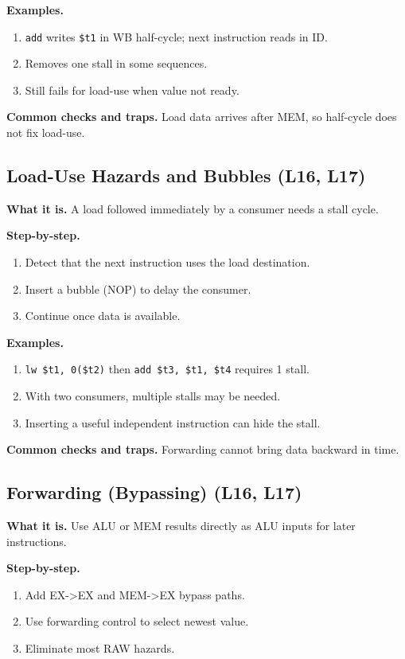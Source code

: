 \documentclass[11pt]{article}
\begin{document}
\textbf{Examples.}
\begin{enumerate}[leftmargin=*]
  \item \texttt{add} writes \texttt{\$t1} in WB half-cycle; next instruction reads in ID.
  \item Removes one stall in some sequences.
  \item Still fails for load-use when value not ready.
\end{enumerate}

\textbf{Common checks and traps.} Load data arrives after MEM, so half-cycle does not fix load-use.

\subsection{Load-Use Hazards and Bubbles (L16, L17)}
\textbf{What it is.} A load followed immediately by a consumer needs a stall cycle.

\textbf{Step-by-step.}
\begin{enumerate}[leftmargin=*]
  \item Detect that the next instruction uses the load destination.
  \item Insert a bubble (NOP) to delay the consumer.
  \item Continue once data is available.
\end{enumerate}

\textbf{Examples.}
\begin{enumerate}[leftmargin=*]
  \item \texttt{lw \$t1, 0(\$t2)} then \texttt{add \$t3, \$t1, \$t4} requires 1 stall.
  \item With two consumers, multiple stalls may be needed.
  \item Inserting a useful independent instruction can hide the stall.
\end{enumerate}

\textbf{Common checks and traps.} Forwarding cannot bring data backward in time.

\subsection{Forwarding (Bypassing) (L16, L17)}
\textbf{What it is.} Use ALU or MEM results directly as ALU inputs for later instructions.

\textbf{Step-by-step.}
\begin{enumerate}[leftmargin=*]
  \item Add EX->EX and MEM->EX bypass paths.
  \item Use forwarding control to select newest value.
  \item Eliminate most RAW hazards.
\end{enumerate}
\end{document}
